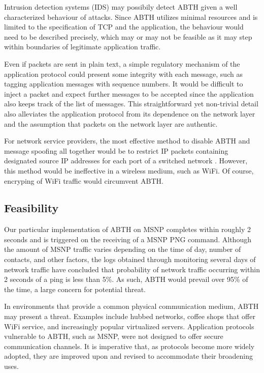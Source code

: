 \documentclass{sig-alternate}
\begin{document}
Intrusion detection systems (IDS) may possibily detect ABTH given a well characterized behaviour of attacks.
Since ABTH utilizes minimal resources and is limited to the specification of TCP and the application, the behaviour would need to be described precisely, which may or may not be feasible as it may step within boundaries of legitimate application traffic.

Even if packets are sent in plain text, a simple regulatory mechanism of the application protocol could present some integrity with each message, such as tagging application messages with sequence numbers.
It would be difficult to inject a packet and expect further messages to be accepted since the application also keeps track of the list of messages.
This straightforward yet non-trivial detail also alleviates the application protocol from its dependence on the network layer and the assumption that packets on the network layer are authentic.

For network service providers, the most effective method to disable ABTH and message spoofing all together would be to restrict IP packets containing designated source IP addresses for each port of a switched network \cite{templeton:spoof}.
However, this method would be ineffective in a wireless medium, such as WiFi.
Of course, encryping of WiFi traffic would circumvent ABTH.

\subsection{Feasibility}

Our particular implementation of ABTH on MSNP completes within roughly 2 seconds and is triggered on the receiving of a MSNP PNG command.
Although the amount of MSNP traffic varies depending on the time of day, number of contacts, and other factors, the logs obtained through monitoring several days of network traffic have concluded that probability of network traffic occurring within 2 seconds of a ping is less than 5\%.
As such, ABTH would prevail over 95\% of the time, a large concern for potential threat.

In environments that provide a common physical communication medium, ABTH may present a threat.
Examples include hubbed networks, coffee shops that offer WiFi service, and increasingly popular virtualized servers.
Application protocols vulnerable to ABTH, such as MSNP, were not designed to offer secure communication channels.
It is imperative that, as protocols become more widely adopted, they are improved upon and revised to accommodate their broadening uses.
\end{document}
